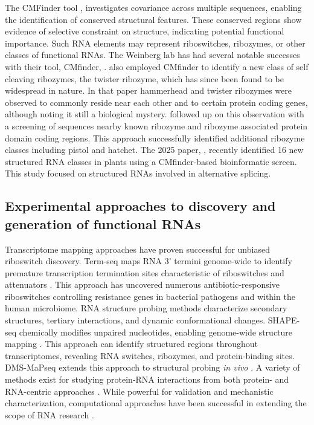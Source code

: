 The CMFinder tool \citet{Yao2006}, investigates covariance across multiple sequences, enabling the identification of conserved structural features.
These conserved regions show evidence of selective constraint on structure, indicating potential functional importance. 
Such RNA elements may represent riboswitches, ribozymes, or other classes of functional RNAs.
The Weinberg lab has had several notable successes with their tool, CMfinder, \citep{Baker2012,Roth2014,Weinberg2015,Baker2012}.
\citet{Roth2014} also employed CMfinder to identify a new class of self cleaving ribozymes, the twister ribozyme, which has since been found to be widespread in nature.
In that paper hammerhead and twister ribozymes were observed to commonly reside near each other and to certain protein coding genes, although noting it still a biological mystery. 
\citet{Weinberg2015} followed up on this observation with a screening of sequences nearby known ribozyme and ribozyme associated protein domain coding regions.
This approach successfully identified additional ribozyme classes including pistol and hatchet.
The 2025 paper, \citet{Sack2025}, recently identified 16 new structured RNA classes in plants using a CMfinder-based bioinformatic screen.
This study focused on structured RNAs involved in alternative splicing.

\subsection{Experimental approaches to discovery and generation of functional RNAs}

Transcriptome mapping approaches have proven successful for unbiased riboswitch discovery. 
Term-seq maps RNA 3' termini genome-wide to identify premature transcription termination sites characteristic of riboswitches and attenuators \citep{Dar2016}. 
This approach has uncovered numerous antibiotic-responsive riboswitches controlling resistance genes in bacterial pathogens and within the human microbiome.
RNA structure probing methods characterize secondary structures, tertiary interactions, and dynamic conformational changes. 
\ac{SHAPE-seq} chemically modifies unpaired nucleotides, enabling genome-wide structure mapping \citep{Lucks2011}. 
This approach can identify structured regions throughout transcriptomes, revealing RNA switches, ribozymes, and protein-binding sites.
\ac{DMS-MaPseq} extends this approach to structural probing \emph{in vivo} \citep{Zubradt2017}.
A variety of methods exist for studying protein-RNA interactions from both protein- and RNA-centric approaches \citep{Yi2025}.
While powerful for validation and mechanistic characterization, computational approaches have been successful in extending the scope of RNA research \citep{Backofen2014}.

